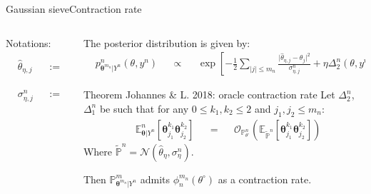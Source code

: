 \documentclass[10pt]{beamer}
\begin{document}
\begin{frame}{Gaussian sieve}{Contraction rate}
\begin{columns}
\begin{column}[T]{.25\textwidth}%

\bigskip
\bigskip

\begin{block}{Notations:}
\begin{alignat*}{3}
& \widehat{\theta}_{\eta, j} &&:=&& \frac{\frac{\theta^{\times}_{j}}{\eta n} + s_{j} y_{j}^{n} \lambda_{j}}{\frac{1}{\eta n} + s_{j} \lambda_{j}^{2}};\\
& && &&\\
& \sigma_{\eta, j}^{n} &&:=&& \frac{s_{j}}{1 + \eta n s_{j} \lambda_{j}^{2}}.
\end{alignat*}
\end{block}
\end{column}
\begin{column}[T]{.8\textwidth}%

The posterior distribution is given by:
\begin{alignat*}{3}
&p_{\boldsymbol{\theta}^{m_{n}}\vert Y^{n}}^{n}(\theta, y^{n}) &&\propto&& \exp\left[-\frac{1}{2} \sum\limits_{\vert j \vert \leq m_{n}} \frac{\vert \widehat{\theta}_{\eta, j} - \theta_{j} \vert ^{2}}{\sigma_{\eta, j}^{n}} + \eta \Delta_{2}^{n}(\theta, y^{n}) + \Delta_{1}^{n}(\theta)\right].
\end{alignat*}
\begin{block}{Theorem Johannes \& L. 2018: oracle contraction rate}
Let $\Delta_{2}^{n}$, $\Delta_{1}^{n}$ be such that for any $0 \leq k_{1}, k_{2} \leq 2$ and $j_{1}, j_{2} \leq m_{n}$:
\begin{alignat*}{3}
& \mathbb{E}_{\boldsymbol{\theta}\vert Y^{n}}^{n}\left[\boldsymbol{\theta}_{j_{1}}^{k_{1}}\boldsymbol{\theta}_{j_{2}}^{k_{2}}\right] && = && \mathcal{O}_{\mathbb{P}_{\theta^{\circ}}^{n}}\left(\mathbb{E}_{\widetilde{\mathbb{P}}^{n}}\left[\boldsymbol{\theta}_{j_{1}}^{k_{1}}\boldsymbol{\theta}_{j_{2}}^{k_{2}}\right]\right)
\end{alignat*}
Where $\widetilde{\mathbb{P}}^{n} = \mathcal{N}(\widehat{\theta}_{\eta}, \sigma_{\eta}^{n})$.

Then $\mathbb{P}_{\boldsymbol{\theta}^{m_{n}}\vert Y^{n}}^{m}$ admits $\phi_{n}^{m_{n}}(\theta^{\circ})$ as a contraction rate.
\end{block}
\end{column}
\end{columns}
\end{frame}
\end{document}

